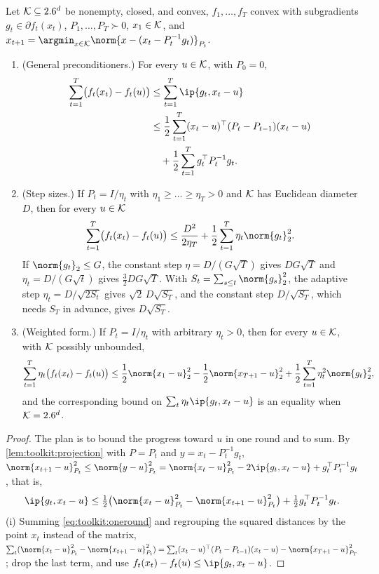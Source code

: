 \begin{refsection}
\begin{theorem}\label{thm:toolkit:ogd}
Let $\mathcal{K}\subseteq2.6^d$ be nonempty, closed, and convex, $f_1,\dots,f_T$ convex with subgradients $g_t\in\partial f_t(x_t)$, $P_1,\dots,P_T\succ0$, $x_1\in\mathcal{K}$, and $x_{t+1}=\argmin_{x\in\cK}\norm{x-(x_t-P_t^{-1}g_t)}_{P_t}$.
\begin{enumerate}
\item (General preconditioners.) For every $u\in\mathcal{K}$, with $P_0=0$,
\[
\begin{aligned}
  \sum_{t=1}^T\bigl(f_t(x_t)-f_t(u)\bigr)&\le\sum_{t=1}^T\ip{g_t,x_t-u}\\
  &\le\frac12\sum_{t=1}^T(x_t-u)^\top(P_t-P_{t-1})(x_t-u)\\
  &\quad+\frac12\sum_{t=1}^Tg_t^\top P_t^{-1}g_t .
\end{aligned}
\]
\item (Step sizes.) If $P_t=I/\eta_t$ with $\eta_1\ge\dots\ge\eta_T>0$ and $\mathcal{K}$ has Euclidean diameter $D$, then for every $u\in\mathcal{K}$
\[
  \sum_{t=1}^T\bigl(f_t(x_t)-f_t(u)\bigr)\le\frac{D^2}{2\eta_T}+\frac12\sum_{t=1}^T\eta_t\norm{g_t}_2^2 .
\]
If $\norm{g_t}_2\le G$, the constant step $\eta=D/(G\sqrt T)$ gives $DG\sqrt T$ and $\eta_t=D/(G\sqrt t)$ gives $\frac32DG\sqrt T$. With $S_t=\sum_{s\le t}\norm{g_s}_2^2$, the adaptive step $\eta_t=D/\sqrt{2S_t}$ gives $\sqrt2\,D\sqrt{S_T}$, and the constant step $D/\sqrt{S_T}$, which needs $S_T$ in advance, gives $D\sqrt{S_T}$.
\item (Weighted form.) If $P_t=I/\eta_t$ with arbitrary $\eta_t>0$, then for every $u\in\mathcal{K}$, with $\mathcal{K}$ possibly unbounded,
\[
  \sum_{t=1}^T\eta_t\bigl(f_t(x_t)-f_t(u)\bigr)\le\frac12\norm{x_1-u}_2^2-\frac12\norm{x_{T+1}-u}_2^2+\frac12\sum_{t=1}^T\eta_t^2\norm{g_t}_2^2,
\]
and the corresponding bound on $\sum_t\eta_t\ip{g_t,x_t-u}$ is an equality when $\mathcal{K}=2.6^d$.
\end{enumerate}
\end{theorem}

\begin{proof}
The plan is to bound the progress toward $u$ in one round and to sum. By \cref{lem:toolkit:projection} with $P=P_t$ and $y=x_t-P_t^{-1}g_t$, $\norm{x_{t+1}-u}_{P_t}^2\le\norm{y-u}_{P_t}^2=\norm{x_t-u}_{P_t}^2-2\ip{g_t,x_t-u}+g_t^\top P_t^{-1}g_t$, that is,
\begin{equation}\label{eq:toolkit:oneround}
  \ip{g_t,x_t-u}\le\tfrac12\bigl(\norm{x_t-u}_{P_t}^2-\norm{x_{t+1}-u}_{P_t}^2\bigr)+\tfrac12g_t^\top P_t^{-1}g_t .
\end{equation}
(i) Summing \eqref{eq:toolkit:oneround} and regrouping the squared distances by the point $x_t$ instead of the matrix, $\sum_t(\norm{x_t-u}_{P_t}^2-\norm{x_{t+1}-u}_{P_t}^2)=\sum_t(x_t-u)^\top(P_t-P_{t-1})(x_t-u)-\norm{x_{T+1}-u}_{P_T}^2$; drop the last term, and use $f_t(x_t)-f_t(u)\le\ip{g_t,x_t-u}$.


\end{proof}
\end{refsection}
